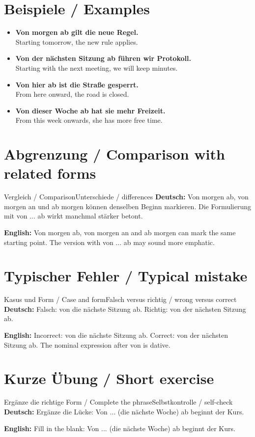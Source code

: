 \documentclass[a4paper,11pt]{article}
\newcommand{\GermanText}[1]{\textbf{Deutsch: }#1\par}
\newcommand{\EnglishText}[1]{{\small\color{SoftGray}\textbf{English: }#1\par}}
\newcommand{\ExampleItem}[2]{\item \textbf{#1}\\{\small\color{SoftGray}#2}}
\begin{document}
\section{Beispiele / Examples}
\begin{exbox}
\begin{itemize}
\ExampleItem{Von morgen ab gilt die neue Regel.}{Starting tomorrow, the new rule applies.}
\ExampleItem{Von der nächsten Sitzung ab führen wir Protokoll.}{Starting with the next meeting, we will keep minutes.}
\ExampleItem{Von hier ab ist die Straße gesperrt.}{From here onward, the road is closed.}
\ExampleItem{Von dieser Woche ab hat sie mehr Freizeit.}{From this week onwards, she has more free time.}
\end{itemize}
\end{exbox}
\section{Abgrenzung / Comparison with related forms}
\begin{grammarentry}{Vergleich / Comparison}{Unterschiede / differences}
\GermanText{Von morgen ab, von morgen an und ab morgen können denselben Beginn markieren. Die Formulierung mit von ... ab wirkt manchmal stärker betont.}
\EnglishText{Von morgen ab, von morgen an and ab morgen can mark the same starting point. The version with von ... ab may sound more emphatic.}
\end{grammarentry}
\section{Typischer Fehler / Typical mistake}
\begin{grammarentry}{Kasus und Form / Case and form}{Falsch versus richtig / wrong versus correct}
\GermanText{Falsch: von die nächste Sitzung ab. Richtig: von der nächsten Sitzung ab.}
\EnglishText{Incorrect: von die nächste Sitzung ab. Correct: von der nächsten Sitzung ab. The nominal expression after von is dative.}
\end{grammarentry}
\section{Kurze Übung / Short exercise}
\begin{grammarentry}{Ergänze die richtige Form / Complete the phrase}{Selbstkontrolle / self-check}
\GermanText{Ergänze die Lücke: Von ... (die nächste Woche) ab beginnt der Kurs.}
\EnglishText{Fill in the blank: Von ... (die nächste Woche) ab beginnt der Kurs.}
\end{grammarentry}
\end{document}
